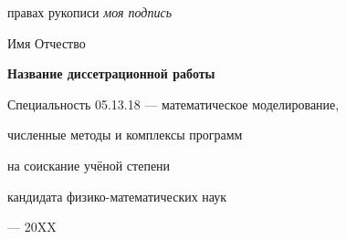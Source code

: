 \fontsize{14pt}{15pt}\selectfont  %
\thispagestyle{empty}

\vspace{10mm}
\begin{flushright}
   правах рукописи
  \textit{моя подпись}
\end{flushright}

\vspace{30mm}
\begin{center}
{\Large{} Имя Отчество}
\end{center}

\vspace{30mm}
\begin{center}
{\bf \LARGE Название диссетрационной работы
\par}

\vspace{30mm}
{\Large
Специальность 05.13.18 --- математическое моделирование,\par
численные методы и комплексы программ
}

\vspace{15mm}
\par
{} на соискание учёной степени\par
кандидата физико-математических наук
\end{center}

\vspace{40mm}
\begin{center}
{ --- 20XX}
\end{center}

\newpage

